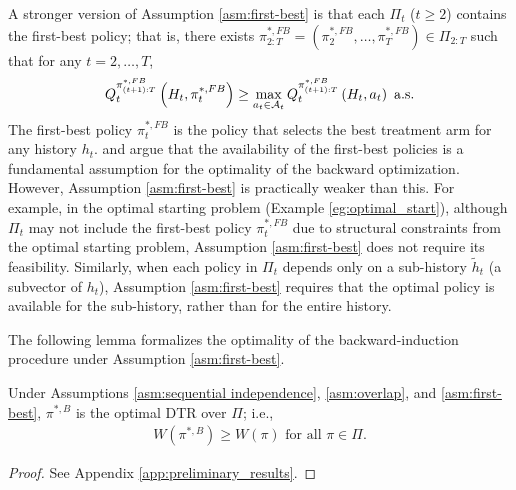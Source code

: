 A stronger version of Assumption \ref{asm:first-best} is that each $\Pi_t$ ($t \geq 2$) contains the first-best policy; that is, there exists $\pi_{2:T}^{\ast,FB} = (\pi_{2}^{\ast,FB},\ldots,\pi_{T}^{\ast,FB})\in \Pi_{2:T}$ such that for any $t=2,\ldots,T$,
\begin{align*}
    Q_{t}^{\pi_{(t+1):T}^{\ast,FB}}\left(H_t,\pi_{t}^{\ast,FB}\right) \geq \max_{a_{t} \in \mathcal{A}_t}Q_{t}^{\pi_{(t+1):T}^{\ast,FB}}\left(H_t,a_t\right) \mbox{\ a.s.}
\end{align*}
The first-best policy $\pi_{t}^{\ast,FB}$ is the policy that selects the best treatment arm for any history $h_t$. \cite{Li_et_al_2023} and \cite{Sakaguchi_2021} argue that the availability of the first-best policies is a fundamental assumption for the optimality of the backward optimization. However, Assumption \ref{asm:first-best} is practically weaker than this.
For example, in the optimal starting problem (Example \ref{eg:optimal_start}), although $\Pi_t$ may not include the first-best policy $\pi_{t}^{\ast,FB}$ due to structural constraints from the optimal starting problem, Assumption \ref{asm:first-best} does not require its feasibility. 
Similarly, when each policy in $\Pi_t$ depends only on a sub-history $\tilde{h}_t$ (a subvector of $h_t$), Assumption \ref{asm:first-best} requires that the optimal policy is available for the sub-history, rather than for the entire history.


The following lemma formalizes the optimality of the backward-induction procedure under Assumption \ref{asm:first-best}.

\medskip

\begin{lemma}\label{lem:optimality_backward_induction}
Under Assumptions \ref{asm:sequential independence}, \ref{asm:overlap}, and \ref{asm:first-best}, $\pi^{\ast,B}$ is the optimal DTR over $\Pi$; i.e.,
\begin{align*}
    W(\pi^{\ast,B}) \geq W(\pi) \mbox{\ for all\ }\pi \in \Pi.
\end{align*}
\end{lemma}

\begin{proof}
See Appendix \ref{app:preliminary_results}.
\end{proof}




